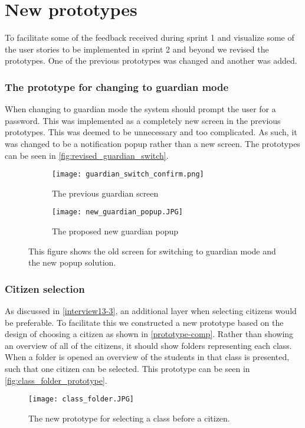\section{New prototypes}
To facilitate some of the feedback received during sprint 1 and visualize some of the user stories to be implemented in sprint 2 and beyond we revised the prototypes.
One of the previous prototypes was changed and another was added.

\subsubsection{The prototype for changing to guardian mode}
When changing to guardian mode the system should prompt the user for a password.
This was implemented as a completely new screen in the previous prototypes.
This was deemed to be unnecessary and too complicated.
As such, it was changed to be a notification popup rather than a new screen.
The prototypes can be seen in \autoref{fig:revised_guardian_switch}.

\begin{figure}[H]
    \begin{subfigure}{0.5\textwidth}
    \texttt{[image: guardian\_switch\_confirm.png]} 
    \caption{The previous guardian screen}
    \label{fig:previous_guardian_screen}
    \end{subfigure}
    \begin{subfigure}{0.5\textwidth}
        \texttt{[image: new\_guardian\_popup.JPG]}
    \caption{The proposed new guardian popup}
    \label{fig:new_guardian_popup}
    \end{subfigure} 
    \caption{This figure shows the old screen for switching to guardian mode and the new popup solution.}
    \label{fig:revised_guardian_switch}
\end{figure}

\subsubsection{Citizen selection}
As discussed in \autoref{interview13-3}, an additional layer when selecting citizens would be preferable.
To facilitate this we constructed a new prototype based on the design of choosing a citizen as shown in \autoref{prototype-comp}.
Rather than showing an overview of all of the citizens, it should show folders representing each class.
When a folder is opened an overview of the students in that class is presented, such that one citizen can be selected.
This prototype can be seen in \autoref{fig:class_folder_prototype}.

\begin{figure}[h]
    \centering
    \texttt{[image: class\_folder.JPG]}
    \caption{The new prototype for selecting a class before a citizen.}
    \label{fig:class_folder_prototype}
  \end{figure}
